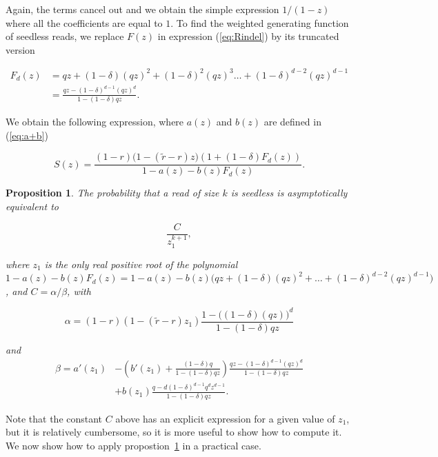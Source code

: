 \documentclass{article}
\newtheorem{proposition}{Proposition}
\begin{document}
Again, the terms cancel out and we obtain the simple expression
$1/(1-z)$ where all the coefficients are equal to $1$. To find the
weighted generating function of seedless reads, we replace $F(z)$ in
expression (\ref{eq:Rindel}) by its truncated version

\begin{equation*}
\begin{split}
F_d(z) &= qz + (1-\delta)(qz)^2 + (1-\delta)^2(qz)^3 \ldots +
(1-\delta)^{d-2}(qz)^{d-1} \\
&= \frac{qz-(1-\delta)^{d-1}(qz)^d}{1-(1-\delta)qz}.
\end{split}
\end{equation*}

We obtain the following expression, where $a(z)$ and $b(z)$ are defined in
(\ref{eq:a+b})

\begin{equation}
\label{eq:Sindel}
S(z) = \frac{(1-r)\big( 1-(\tilde{r}-r)z \big) \left(1+(1-\delta)F_d(z)
\right)}{1-a(z)-b(z)F_d(z)}.
\end{equation}


\begin{proposition}
\label{th:pins}
The probability that a read of size $k$ is seedless is asymptotically
equivalent to

\begin{equation*}
\frac{C}{z_1^{k+1}},
\end{equation*}

\noindent
where $z_1$ is the only real positive root of the polynomial
$1-a(z)-b(z)F_d(z) = 1-a(z)-b(z)\big(qz+(1-\delta)(qz)^2 + \ldots +
(1-\delta)^{d-2}(qz)^{d-1}\big)$, and $C = \alpha / \beta$, with

\begin{equation*}
\alpha = (1-r)(1-(\tilde{r}-r)z_1)
   \frac{1-\big((1-\delta)(qz)\big)^d}{1-(1-\delta)qz}
\end{equation*}

\noindent
and
\begin{equation*}
\begin{split}
\beta = a'(z_1) &- \left( b'(z_1) +
\frac{(1-\delta)q}{1-(1-\delta)qz}\right)
\frac{qz-(1-\delta)^{d-1}(qz)^d}{1-(1-\delta)qz} \\
&+b(z_1) \frac{q-d(1-\delta)^{d-1}q^dz^{d-1}}{1-(1-\delta)qz}.
\end{split}
\end{equation*}
\end{proposition}

Note that the constant $C$ above has an explicit expression for a given
value of $z_1$, but it is relatively cumbersome, so it is more useful to
show how to compute it. We now show how to apply propostion~\ref{th:pins}
in a practical case.
\end{document}
